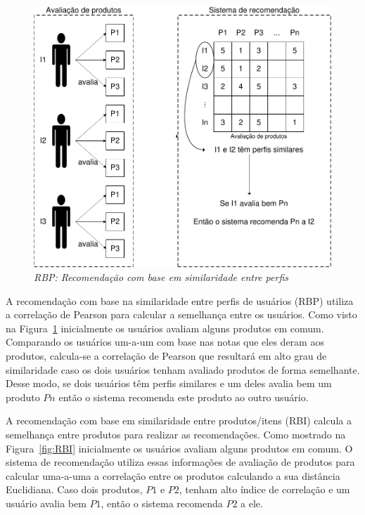 \begin{figure}
  \centering
  \includegraphics[width=\textwidth]{imagens/RBP}
  \caption{\it RBP: Recomendação com base em similaridade entre perfis}
  \label{fig:RBP}
\end{figure}
 
 A recomendação com base na similaridade entre perfis de usuários (RBP) utiliza a correlação de Pearson para calcular a semelhança entre os usuários. Como visto na Figura~\ref{fig:RBP} inicialmente os usuários avaliam alguns produtos em comum. Comparando os usuários um-a-um com base nas notas que eles deram aos produtos, calcula-se a correlação de Pearson que resultará em alto grau de similaridade caso os dois usuários tenham avaliado produtos de forma semelhante. Desse modo, se dois usuários têm perfis similares e um deles avalia bem um produto $P{n}$ então o sistema recomenda este produto ao outro usuário.
 
 A recomendação com base em similaridade entre produtos/itens (RBI) calcula a semelhança entre produtos para realizar as recomendações. Como mostrado na Figura~\ref{fig:RBI} inicialmente os usuários avaliam alguns produtos em comum. O sistema de recomendação utiliza essas informações de avaliação de produtos para calcular uma-a-uma a correlação entre os produtos calculando a sua distância Euclidiana. Caso dois produtos, $P{1}$ e $P{2}$, tenham alto índice de correlação e um usuário avalia bem $P{1}$, então o sistema recomenda $P{2}$ a ele.

